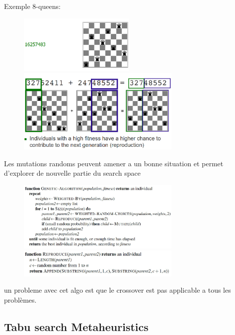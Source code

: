 		Exemple 8-queens:
		\begin{figure}[H]
			\centering
			\includegraphics[width=0.5\textwidth]{img/8QueenGA1.png}
			\includegraphics[width=0.7\textwidth]{img/8QueenGA2.png}
		\end{figure}
		
		Les mutations randoms peuvent amener a un bonne situation et permet d'explorer de nouvelle partie du search space
		
		\begin{figure}[H]
			\centering
			\includegraphics[width=0.7\textwidth]{img/AlgoGA1.png}
			\includegraphics[width=0.7\textwidth]{img/AlgoGA2.png}
		\end{figure}
		
		un probleme avec cet algo est que le crossover est pas applicable a tous les problèmes.
		
		
	\subsection{Tabu search Metaheuristics}
		

